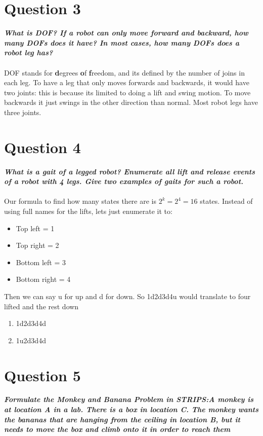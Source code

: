 \documentclass{article}
\newcommand\tab[1][1cm]{\hspace*{#1}}
\begin{document}
\section*{Question 3}
\textbf{\textit{
    \tab What is DOF? If a robot can only move forward and backward, 
    how many DOFs does it have? In most cases, how many DOFs does a robot leg has?
}} \\ \\
DOF stands for \textbf{d}egrees \textbf{o}f \textbf{f}reedom, and its defined by the
number of joins in each leg. To have a leg that only moves forwards and backwards,
it would have two joints: this is because its limited to doing a lift and swing motion.
To move backwards it just swings in the other direction than normal. Most robot legs
have three joints.
\section*{Question 4}
\textbf{\textit{
    \tab What is a gait of a legged robot? Enumerate all lift and release 
    events of a robot with 4 legs. Give two examples of gaits for such a robot.
}} \\ \\
Our formula to find how many states there are is $2^k = 2^4 = 16$ states. Instead
of using full names for the lifts, lets just enumerate it to:
\begin{itemize}
    \item Top left = 1
    \item Top right = 2
    \item Bottom left = 3
    \item Bottom right = 4
\end{itemize}
Then we can say u for up and d for down. So 1d2d3d4u would translate to four lifted and the rest down
\begin{enumerate}
        \item 1d2d3d4d %

        \item 1u2d3d4d %
\end{enumerate}
\section*{Question 5}
\textbf{\textit{
    \tab Formulate the Monkey and Banana Problem in STRIPS:A monkey is at location A in a lab. There is a box in location C. The monkey wants the bananas that are hanging from the ceiling in location B, but it needs to move the box and climb onto it in order to reach them
}} \\ \\
\end{document}
